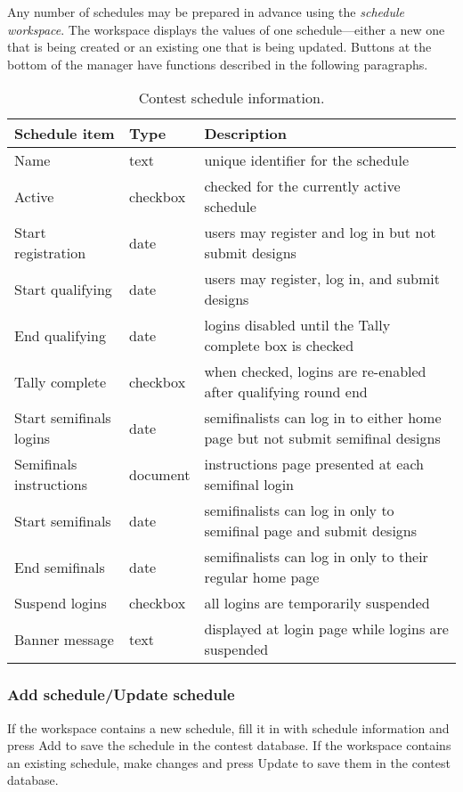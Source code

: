\documentclass[11pt,letterpaper]{refart}
\newenvironment{fulltable}[1][tbp]
 {\begin{table}[#1]%
  \hspace*{-\leftmarginwidth}%
  \begin{minipage}{\fullwidth}}
 {\end{minipage}\end{table}}
\def\ui#1{\textsf{#1}}
\begin{document}
Any number of schedules
may be prepared in advance using the \emph{schedule workspace}.
The workspace displays the values of one schedule---either a new
one that is being created or an existing one that is being updated.
Buttons at the bottom of the manager have functions described in the
following paragraphs.
\begin{fulltable}
\centering
\caption{Contest schedule information.}
\begin{tabular}{>{\sffamily}llp{9cm}}
\bfseries Schedule item & \bfseries Type & \bfseries Description \\ \hline 
Name & text & unique identifier for the schedule \\
Active & checkbox & checked for the currently active schedule \\
Start registration & date & users may register and log in but not submit designs \\
Start qualifying & date & users may register, log in, and submit designs \\
End qualifying & date & logins disabled until the \ui{Tally complete} box is checked \\
Tally complete & checkbox & when checked, logins are re-enabled after qualifying round end \\
Start semifinals logins & date & semifinalists can log in to either home page but not submit semifinal designs\\
Semifinals instructions & document & instructions page presented at each semifinal login\\
Start semifinals & date & semifinalists can log in only to semifinal page and submit designs \\
End semifinals & date & semifinalists can log in only to their regular home page \\
Suspend logins & checkbox & all logins are temporarily suspended \\
Banner message & text & displayed at login page while logins are suspended
\end{tabular}
\label{tbl:schedule}
\end{fulltable}

\subsubsection{Add schedule/Update schedule}
If the workspace contains a new schedule, fill it in with schedule information
and press \ui{Add} to save the schedule in the contest database. If the
workspace contains an existing schedule, make changes and press \ui{Update}
to save them in the contest database.
\end{document}
